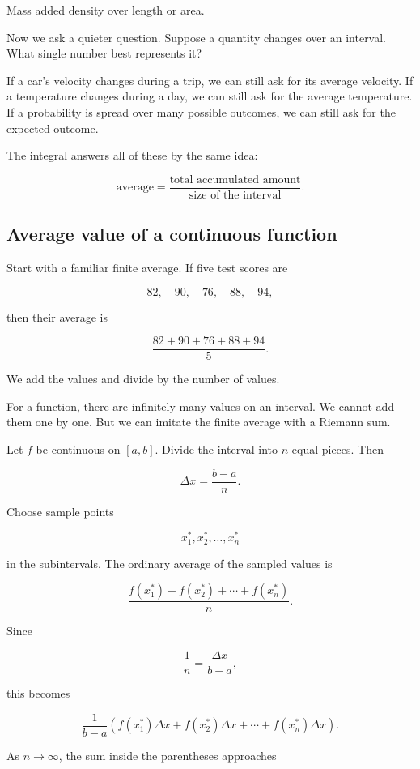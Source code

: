 Mass added density over length or area.

Now we ask a quieter question.  Suppose a quantity changes over an interval.  What
single number best represents it?

If a car's velocity changes during a trip, we can still ask for its average velocity.  If a
temperature changes during a day, we can still ask for the average temperature.  If a
probability is spread over many possible outcomes, we can still ask for the expected
outcome.

The integral answers all of these by the same idea:

\[
\boxed{
\text{average}=\frac{\text{total accumulated amount}}{\text{size of the interval}}.
}
\]

\subsection{Average value of a continuous function}
\label{subsec:average-value-continuous-function}

Start with a familiar finite average.  If five test scores are

\[
82,\quad 90,\quad 76,\quad 88,\quad 94,
\]

then their average is

\[
\frac{82+90+76+88+94}{5}.
\]

We add the values and divide by the number of values.

For a function, there are infinitely many values on an interval.  We cannot add them one
by one.  But we can imitate the finite average with a Riemann sum.

Let \(f\) be continuous on \([a,b]\).  Divide the interval into \(n\) equal pieces.  Then

\[
\Delta x=\frac{b-a}{n}.
\]

Choose sample points

\[
x_1^*,x_2^*,\ldots,x_n^*
\]

in the subintervals.  The ordinary average of the sampled values is

\[
\frac{f(x_1^*)+f(x_2^*)+\cdots+f(x_n^*)}{n}.
\]

Since

\[
\frac1n=\frac{\Delta x}{b-a},
\]

this becomes

\[
\frac{1}{b-a}
\left(
f(x_1^*)\Delta x+f(x_2^*)\Delta x+\cdots+f(x_n^*)\Delta x
\right).
\]

As \(n\to\infty\), the sum inside the parentheses approaches

